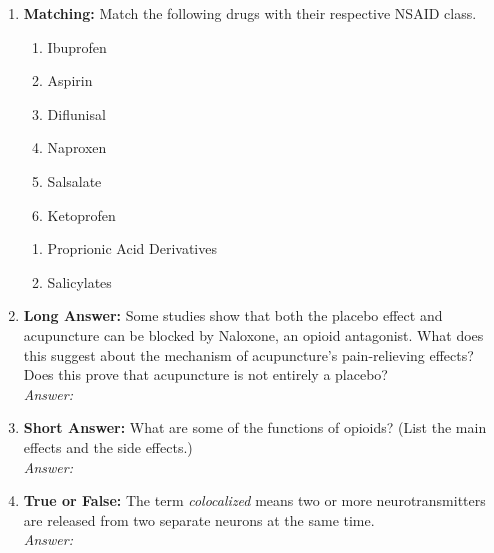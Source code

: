 \begin{enumerate}[label=\textbf{Q3.2.\arabic*}]
    \item \textbf{Matching:} Match the following drugs with their respective NSAID class.
    \begin{wordbox}
        \begin{enumerate}
            \item Ibuprofen
            \item Aspirin
            \item Diflunisal
            \item Naproxen
            \item Salsalate
            \item Ketoprofen
        \end{enumerate}
    \end{wordbox}
    \begin{enumerate}[label=(\arabic*)]
        \item Proprionic Acid Derivatives \quad \dotfill \quad \underline{\hspace{4cm}}
        \item Salicylates \quad \dotfill \quad \underline{\hspace{4cm}}
    \end{enumerate}



    \item \textbf{Long Answer:} Some studies show that both the placebo effect and acupuncture can be blocked by Naloxone, an opioid antagonist. What does this suggest about the mechanism of acupuncture’s pain-relieving effects? Does this prove that acupuncture is not entirely a placebo? \\
        \textit{Answer:} \\ %
    
    \item \textbf{Short Answer:} What are some of the functions of opioids? (List the main effects and the side effects.) \\
        \textit{Answer:} \\%
    \item \textbf{True or False:} The term \textit{colocalized} means two or more neurotransmitters are released from two separate neurons at the same time. \\ 
        \textit{Answer:} %


\end{enumerate}
